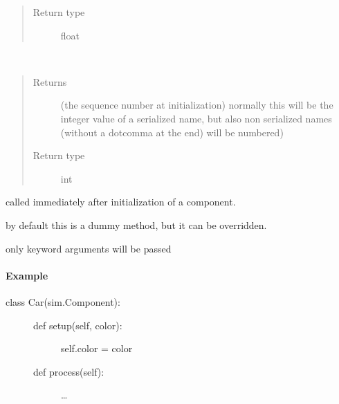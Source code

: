 \documentclass[letterpaper,10pt,english]{sphinxmanual}
\begin{document}
\begin{fulllineitems}
\begin{fulllineitems}
\begin{quote}
\begin{description}
\item[{Return type}] \leavevmode
float

\end{description}\end{quote}

\end{fulllineitems}


\begin{fulllineitems}
\label{\detokenize{Reference:salabim.Component.sequence_number}}~\begin{quote}\begin{description}
\item[{Returns}] \leavevmode
{} \textendash{} (the sequence number at initialization) 
normally this will be the integer value of a serialized name,
but also non serialized names (without a dotcomma at the end)
will be numbered)

\item[{Return type}] \leavevmode
int

\end{description}\end{quote}

\end{fulllineitems}


\begin{fulllineitems}
\label{\detokenize{Reference:salabim.Component.setup}}
called immediately after initialization of a component.

by default this is a dummy method, but it can be overridden.

only keyword arguments will be passed
\paragraph{Example}
\begin{description}
\item[{class Car(sim.Component):}] \leavevmode\begin{description}
\item[{def setup(self, color):}] \leavevmode
self.color = color

\item[{def process(self):}] \leavevmode
…


\end{description}
\end{description}
\end{fulllineitems}
\end{fulllineitems}
\end{document}
